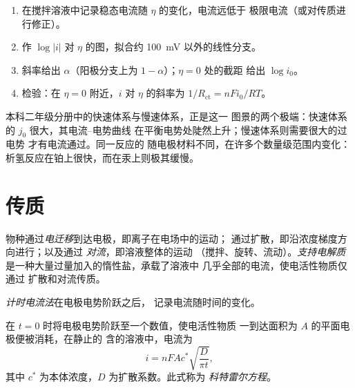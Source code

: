 \begin{method}[塔费尔分析]\label{met:b3:electrode-kinetics:tafel-analysis}
\begin{enumerate}
  \item 在搅拌溶液中记录稳态电流随 $\eta$ 的变化，电流远低于
        极限电流（或对传质进行修正）。
  \item 作 $\log|i|$ 对 $\eta$ 的图，拟合约 \qty{100}{mV} 以外的线性分支。
  \item 斜率给出 $\alpha$（阳极分支上为 $1 - \alpha$）；$\eta = 0$ 处的截距
        给出 $\log i_0$。
  \item 检验：在 $\eta = 0$ 附近，$i$ 对 $\eta$ 的斜率为 $1/R_{\mathrm{ct}} = nFi_0/RT$。
\end{enumerate}
\end{method}

本科二年级分册中的快速体系与慢速体系，正是这一
图景的两个极端：快速体系的 $j_0$ 很大，其电流–电势曲线
在平衡电势处陡然上升；慢速体系则需要很大的过电势
才有电流通过。同一反应的
随电极材料不同，在许多个数量级范围内变化：
析氢反应在铂上很快，而在汞上则极其缓慢。

\section{传质}

\begin{definition}[传质方式]\label{def:b3:electrode-kinetics:transport}
物种通过\emph{电迁移}到达电极，即离子在电场中的运动；
通过扩散，即沿浓度梯度方向进行；以及通过
\emph{对流}，即溶液整体的运动
（搅拌、旋转、流动）。\emph{支持电解质}
是一种大量过量加入的惰性盐，承载了溶液中
几乎全部的电流，使电活性物质仅通过
扩散和对流传质。
\end{definition}

\begin{definition}[计时电流法]\label{def:b3:electrode-kinetics:chronoamperometry}
\emph{计时电流法}在电极电势阶跃之后，
记录电流随时间的变化。
\end{definition}

\begin{theorem}[科特雷尔方程]\label{thm:b3:electrode-kinetics:cottrell}
在 $t = 0$ 时将电极电势阶跃至一个数值，使电活性物质
一到达面积为 $A$ 的平面电极便被消耗，在静止的
含的溶液中，电流为
\[
  i = nFAc^*\sqrt{\frac{D}{\pi t}},
\]
其中 $c^*$ 为本体浓度，$D$ 为扩散系数。此式称为
\emph{科特雷尔方程}。
\end{theorem}

